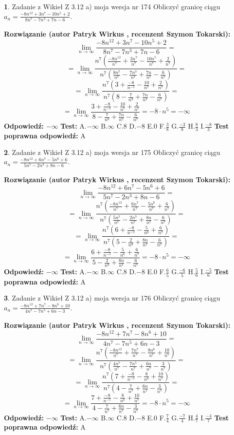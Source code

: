 \documentclass[12pt, a4paper]{article}
\theoremstyle{definition} %
\newtheorem{zad}{}
\newcommand{\zadStart}[1]{\begin{zad}#1\newline}
\newcommand{\zadStop}{\end{zad}}
\newcommand{\rozwStart}[2]{\noindent \textbf{Rozwiązanie (autor #1 , recenzent #2): }\newline}
\newcommand{\rozwStop}{\newline}
\newcommand{\odpStart}{\noindent \textbf{Odpowiedź:}\newline}
\newcommand{\odpStop}{\newline}
\newcommand{\testStart}{\noindent \textbf{Test:}\newline}
\newcommand{\testStop}{\newline}
\newcommand{\kluczStart}{\noindent \textbf{Test poprawna odpowiedź:}\newline}
\newcommand{\kluczStop}{\newline}
\begin{document}
\zadStart{Zadanie z Wikieł Z 3.12 a) moja wersja nr 174}
Obliczyć granicę ciągu $a_{n}=\frac{-8n^{12}+3n^{7}-10n^{5}+2}{8n^{7}-7n^{3}+7n-6}$.
\zadStop
\rozwStart{Patryk Wirkus}{Szymon Tokarski}
$$\lim\limits_{n\to\infty}\frac{-8n^{12}+3n^{7}-10n^{5}+2}{8n^{7}-7n^{3}+7n-6}=$$
$$=\lim\limits_{n\to\infty}\frac{n^{7}\left(\frac{-8n^{12}}{n^{7}}+\frac{3n^{7}}{n^{7}}-\frac{10n^{5}}{n^{7}}+\frac{2}{n^{7}}\right)}{n^{7}\left(\frac{8n^{7}}{n^{7}}-\frac{7n^{3}}{n^{7}}+\frac{7n}{n^{7}}-\frac{6}{n^{7}}\right)}=$$
$$=\lim\limits_{n\to\infty}\frac{n^{7}\left(3+\frac{-8}{n^{-5}}-\frac{10}{n^{7}}+\frac{2}{n^{7}}\right)}
{n^{7}\left(8-\frac{7}{n^{9}}+\frac{7n}{n^{7}}-\frac{6}{n^{7}}\right)}=$$
$$=\lim\limits_{n\to\infty}\frac{3+\frac{-8}{n^{-5}}-\frac{10}{n^{7}}+\frac{2}{n^{7}}}{8-\frac{7}{n^{9}}+\frac{7n}{n^{7}}-\frac{6}{n^{7}}}=-8\cdot n^{5} = -\infty$$
\rozwStop
\odpStart
$-\infty$
\odpStop
\testStart
A.$-\infty$
B.$\infty$
C.$8$
D.$-8$
E.$0$
F.$\frac{3}{8}$
G.$\frac{-3}{8}$
H.$\frac{8}{3}$
I.$\frac{-8}{3}$
\testStop
\kluczStart
A
\kluczStop



\zadStart{Zadanie z Wikieł Z 3.12 a) moja wersja nr 175}
Obliczyć granicę ciągu $a_{n}=\frac{-8n^{12}+6n^{7}-5n^{6}+6}{5n^{7}-2n^{3}+8n-6}$.
\zadStop
\rozwStart{Patryk Wirkus}{Szymon Tokarski}
$$\lim\limits_{n\to\infty}\frac{-8n^{12}+6n^{7}-5n^{6}+6}{5n^{7}-2n^{3}+8n-6}=$$
$$=\lim\limits_{n\to\infty}\frac{n^{7}\left(\frac{-8n^{12}}{n^{7}}+\frac{6n^{7}}{n^{7}}-\frac{5n^{6}}{n^{7}}+\frac{6}{n^{7}}\right)}{n^{7}\left(\frac{5n^{7}}{n^{7}}-\frac{2n^{3}}{n^{7}}+\frac{8n}{n^{7}}-\frac{6}{n^{7}}\right)}=$$
$$=\lim\limits_{n\to\infty}\frac{n^{7}\left(6+\frac{-8}{n^{-5}}-\frac{5}{n^{6}}+\frac{6}{n^{7}}\right)}
{n^{7}\left(5-\frac{2}{n^{9}}+\frac{8n}{n^{7}}-\frac{6}{n^{7}}\right)}=$$
$$=\lim\limits_{n\to\infty}\frac{6+\frac{-8}{n^{-5}}-\frac{5}{n^{6}}+\frac{6}{n^{7}}}{5-\frac{2}{n^{9}}+\frac{8n}{n^{7}}-\frac{6}{n^{7}}}=-8\cdot n^{5} = -\infty$$
\rozwStop
\odpStart
$-\infty$
\odpStop
\testStart
A.$-\infty$
B.$\infty$
C.$8$
D.$-8$
E.$0$
F.$\frac{6}{5}$
G.$\frac{-6}{5}$
H.$\frac{5}{6}$
I.$\frac{-5}{6}$
\testStop
\kluczStart
A
\kluczStop



\zadStart{Zadanie z Wikieł Z 3.12 a) moja wersja nr 176}
Obliczyć granicę ciągu $a_{n}=\frac{-8n^{12}+7n^{7}-8n^{6}+10}{4n^{7}-7n^{5}+6n-3}$.
\zadStop
\rozwStart{Patryk Wirkus}{Szymon Tokarski}
$$\lim\limits_{n\to\infty}\frac{-8n^{12}+7n^{7}-8n^{6}+10}{4n^{7}-7n^{5}+6n-3}=$$
$$=\lim\limits_{n\to\infty}\frac{n^{7}\left(\frac{-8n^{12}}{n^{7}}+\frac{7n^{7}}{n^{7}}-\frac{8n^{6}}{n^{7}}+\frac{10}{n^{7}}\right)}{n^{7}\left(\frac{4n^{7}}{n^{7}}-\frac{7n^{5}}{n^{7}}+\frac{6n}{n^{7}}-\frac{3}{n^{7}}\right)}=$$
$$=\lim\limits_{n\to\infty}\frac{n^{7}\left(7+\frac{-8}{n^{-5}}-\frac{8}{n^{6}}+\frac{10}{n^{7}}\right)}
{n^{7}\left(4-\frac{7}{n^{7}}+\frac{6n}{n^{7}}-\frac{3}{n^{7}}\right)}=$$
$$=\lim\limits_{n\to\infty}\frac{7+\frac{-8}{n^{-5}}-\frac{8}{n^{6}}+\frac{10}{n^{7}}}{4-\frac{7}{n^{7}}+\frac{6n}{n^{7}}-\frac{3}{n^{7}}}=-8\cdot n^{5} = -\infty$$
\rozwStop
\odpStart
$-\infty$
\odpStop
\testStart
A.$-\infty$
B.$\infty$
C.$8$
D.$-8$
E.$0$
F.$\frac{7}{4}$
G.$\frac{-7}{4}$
H.$\frac{4}{7}$
I.$\frac{-4}{7}$
\testStop
\kluczStart
A
\kluczStop
\end{document}
